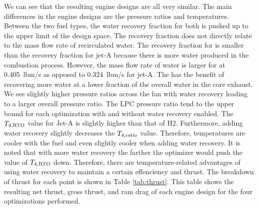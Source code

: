 \documentclass[conf]{new-aiaa}
\begin{document}
We can see that the resulting engine designs are all very similar.
The main differences in the engine designs are the pressure ratios and temperatures.
Between the two fuel types, the water recovery fraction for both is pushed up to the upper limit of the design space.
The recovery fraction does not directly relate to the mass flow rate of recirculated water.
The recovery fraction for  is smaller than the recovery fraction for jet-A because there is more water produced in the combustion process.
However, the mass flow rate of water is larger for  at \SI{0.405}{lbm/s} as opposed to \SI{0.324}{lbm/s} for jet-A.
The  has the benefit of recovering more water at a lower fraction of the overall water in the core exhaust.
We see slightly higher pressure ratios across the fan with water recovery leading to a larger overall pressure ratio.
The LPC pressure ratio tend to the upper bound for each optimization with and without water recovery enabled.
The $T_{4,\rm{RTO}}$ value for Jet-A is slightly higher than that of H2.
Furthermore, adding water recovery slightly decreases the $T_{4,\rm{ratio}}$ value.
Therefore, temperatures are cooler with the  fuel and even slightly cooler when adding water recovery.
It is noted that with more water recovery the farther the optimizer would push the value of $T_{4,\rm{RTO}}$ down.
Therefore, there are temperature-related advantages of using water recovery to maintain a certain effenciency and thrust.
The breakdown of thrust for each point is shown in Table \ref{tab:thrust}.
This table shows the resulting net thrust, gross thrust, and ram drag of each engine design for the four optimizations performed.
\end{document}
